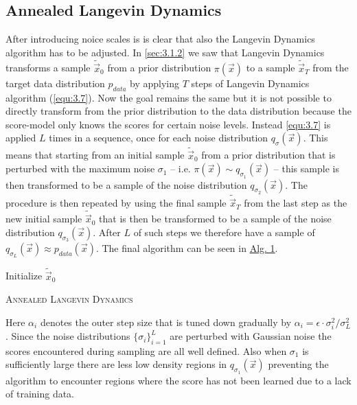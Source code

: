 \subsection{Annealed Langevin Dynamics}
After introducing noice scales is is clear that also the Langevin Dynamics algorithm has to be adjusted. In \cref{sec:3.1.2} we saw that Langevin Dynamics transforms a sample $\tilde{\vec{x}}_0$ from a prior distribution $\pi(\vec{x})$ to a sample $\tilde{\vec{x}}_T$ from the target data distribution $p_{data}$ by applying $T$ steps of Langevin Dynamics algorithm (\cref{equ:3.7}). Now the goal remains the same but it is not possible to directly transform from the prior distribution to the data distribution because the score-model only knows the scores for certain noise levels. Instead \cref{equ:3.7} is applied $L$ times in a sequence, once for each noise distribution $q_\sigma(\vec{x})$. This means that starting from an initial sample $\tilde{\vec{x}}_0$ from a prior distribution that is perturbed with the maximum noise $\sigma_1$ – i.e. $\pi(\vec{x})\sim q_{\sigma_1}(\vec{x})$ – this sample is then transformed to be a sample of the noise distribution $q_{\sigma_{2}}(\vec{x})$. The procedure is then repeated by using the final sample $\tilde{\vec{x}}_T$ from the last step as the new initial sample $\tilde{\vec{x}}_0$ that is then be transformed to be a sample of the noise distribution $q_{\sigma_{3}}(\vec{x})$. After $L$ of such steps we therefore have a sample of $q_{\sigma_L}(\vec{x})\approx p_{data}(\vec{x})$. The final algorithm can be seen in \hyperref[alg:1]{Alg. 1}.
%
\begin{algorithm} \label{alg:1}
    \DontPrintSemicolon
    Initialize $\tilde{\vec{x}}_0$\;
    \caption{\textsc{Annealed Langevin Dynamics}}
\end{algorithm}
%
Here $\alpha_i$ denotes the outer step size that is tuned down gradually by $\alpha_i=\epsilon\cdot\sigma_i^2/\sigma_L^2$. Since the noise distributions $\{\sigma_i\}_{i=1}^L$ are perturbed with Gaussian noise the scores encountered during sampling are all well defined. Also when $\sigma_1$ is sufficiently large there are less low density regions in $q_{\sigma_1}(\vec{x})$ preventing the algorithm to encounter regions where the score has not been learned due to a lack of training data.

